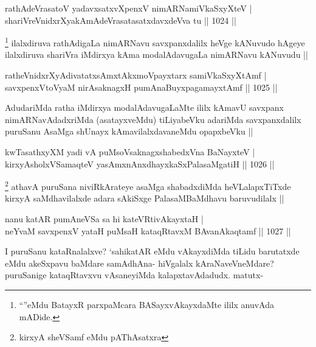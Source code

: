 \begin{shl}
rathAdeVrasatoV yadavxsatxvXpenxV nimARNamiVkaSxyXteV | \\
shariVreVnidxrXyakAmAdeVrasatasatxdavxdeVva tu \hfill||  1024 ||  
\end{shl}

\begin{artha}
\footnote{``\stext''eMdu BatayxR parxpaMcara BASayxvAkayxdaMte ililx anuvAda mADide.}
ilalxdiruva rathAdigaLa nimARNavu savxpanxdalilx heVge kANuvudo
hAgeye ilalxdiruva shariVra iMdirxya kAma modalAdavugaLa nimARNavu kANuvudu ||
\end{artha}

\begin{shl}
ratheVnidxrXyAdivatatxsAmxtAkxmoV\s payxtarx samiVkaSxyXtAmf | \\
savxpenxV\s toV\s yaM nirAsaknagxH pumAnaBuyxpagamayxtAmf \hfill||  1025 ||  
\end{shl}

\begin{artha}
AdudariMda ratha iMdirxya modalAdavugaLaMte ililx kAmavU savxpanx nimARNavAdadxriMda (asatayxveMdu) tiLiyabeVku adariMda savxpanxdalilx puruSanu AsaMga shUnayx kAmavilalxdavaneMdu opapxbeVku ||
\end{artha}


\begin{shl}
kwTasathxyXM yadi vA puMsoV\s saknagxshabedxVna BaNayxteV | \\
kirxyAsholxVSamaqteV yasAmxnAnxdhayxkaSxPalasaMgatiH \hfill||  1026 ||  
\end{shl}

\begin{artha}
\footnote{kirxyA sheVSamf eMdu pAThAsatxra}
athavA puruSana niviRkArateye asaMga shabadxdiMda heVLalapxTiTxde kirxyA saMdhavilalxde adara sAkiSxge PalasaMBaMdhavu baruvudilalx ||
\end{artha}


\begin{shl}
nanu katAR pumAneVSa sa hi kateVRtivAkayxtaH | \\
neYvaM savxpenxV yataH puMsaH kataqRtavxM BAvanAkaqtamf \hfill||  1027 ||  
\end{shl}

\begin{artha}
I puruSanu kataRnalalxve? `sahikatAR eMdu vAkayxdiMda tiLidu barutatxde eMdu akeSxpavu baMdare samAdhAna- hiVgalalx kAraNaveVneMdare? puruSanige kataqRtavxvu vAsaneyiMda kalapxtavAdadudx. matutx-
\end{artha}

